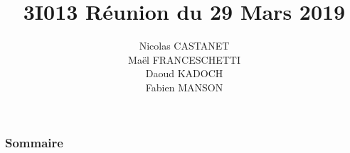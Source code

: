 \documentclass{beamer}
\title{3I013 Réunion du 29 Mars 2019}
\author{Nicolas CASTANET\\Maël FRANCESCHETTI\\Daoud KADOCH\\Fabien MANSON\\}
\begin{document}
	\begin{frame}
		\begin{center}
		\date{}
		\maketitle
		\end{center}
	\end{frame}
	
	
	\begin{frame}
		\section{}
		\begin{center}
		\frametitle{Sommaire}
		\tableofcontents{}
		\end{center}
	\end{frame}
	
	
\end{document}
